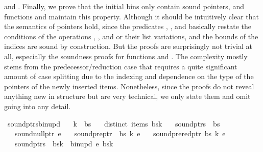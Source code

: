 \begin{isabellebody}
\begin{isamarkuptext}
and . Finally, we prove that the initial bins only contain sound pointers, and functions 
and  maintain this property. Although it should be intuitively clear that the
semantics of pointers hold, since the predicates , , and  basically
restate the conditions of the operations , , and  or their list variations,
and the bounds of the indices are sound by construction. But the proofs are surprisingly not trivial at all, especially the soundness
proofs for functions  and . The complexity mostly stems from
the predecessor/reduction case that requires a quite significant amount of case splitting due to the indexing and dependence
on the type of the pointers of the newly inserted items. Nonetheless, since the proofs do not reveal anything new in structure
but are very technical, we only state them and omit going into any detail.%
\end{isamarkuptext}\isamarkuptrue%
\isamarkupfalse%
\ sound{\isacharunderscore}{\kern0pt}ptrs{\isacharunderscore}{\kern0pt}bin{\isacharunderscore}{\kern0pt}upd{\isacharcolon}{\kern0pt}\isanewline
\ \ \ {\isachardoublequoteopen}k\ {\isacharless}{\kern0pt}\ {\isacharbar}{\kern0pt}bs{\isacharbar}{\kern0pt}{\isachardoublequoteclose}\isanewline
\ \ \ {\isachardoublequoteopen}distinct\ {\isacharparenleft}{\kern0pt}items\ {\isacharparenleft}{\kern0pt}bs{\isacharbang}{\kern0pt}k{\isacharparenright}{\kern0pt}{\isacharparenright}{\kern0pt}{\isachardoublequoteclose}\isanewline
\ \ \ {\isachardoublequoteopen}sound{\isacharunderscore}{\kern0pt}ptrs\ {\isasymomega}\ bs{\isachardoublequoteclose}\isanewline
\ \ \ {\isachardoublequoteopen}sound{\isacharunderscore}{\kern0pt}null{\isacharunderscore}{\kern0pt}ptr\ e{\isachardoublequoteclose}\isanewline
\ \ \ {\isachardoublequoteopen}sound{\isacharunderscore}{\kern0pt}pre{\isacharunderscore}{\kern0pt}ptr\ {\isasymomega}\ bs\ k\ e{\isachardoublequoteclose}\isanewline
\ \ \ {\isachardoublequoteopen}sound{\isacharunderscore}{\kern0pt}prered{\isacharunderscore}{\kern0pt}ptr\ bs\ k\ e{\isachardoublequoteclose}\isanewline
\ \ \ {\isachardoublequoteopen}sound{\isacharunderscore}{\kern0pt}ptrs\ {\isasymomega}\ {\isacharparenleft}{\kern0pt}bs{\isacharbrackleft}{\kern0pt}k\ {\isacharcolon}{\kern0pt}{\isacharequal}{\kern0pt}\ bin{\isacharunderscore}{\kern0pt}upd\ e\ {\isacharparenleft}{\kern0pt}bs{\isacharbang}{\kern0pt}k{\isacharparenright}{\kern0pt}{\isacharbrackright}{\kern0pt}{\isacharparenright}{\kern0pt}{\isachardoublequoteclose}%

\end{isabellebody}
